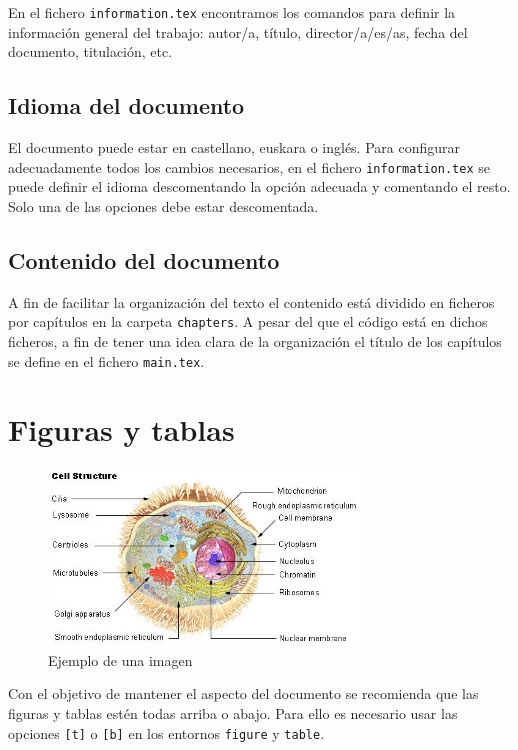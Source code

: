 En el fichero \texttt{information.tex} encontramos los comandos para definir la información general del trabajo: autor/a, título, director/a/es/as, fecha del documento, titulación, etc.

\subsection{Idioma del documento}

El documento puede estar en castellano, euskara o inglés. Para configurar adecuadamente todos los cambios necesarios, en el fichero \texttt{information.tex} se puede definir el idioma descomentando la opción adecuada y comentando el resto. Solo una de las opciones debe estar descomentada.




\subsection{Contenido del documento}

A fin de facilitar la organización del texto el contenido está dividido en ficheros por capítulos en la carpeta \texttt{chapters}. A pesar del que el código está en dichos ficheros, a fin de tener una idea clara de la organización el título de los capítulos se define en el fichero \texttt{main.tex}.

\section{Figuras y tablas}

\begin{figure}[t]
    \centering
	\includegraphics[width=0.75\textwidth]{figures/cell.jpg}
	\caption{Ejemplo de una imagen}\label{fig:ejemplo}
\end{figure}

Con el objetivo de mantener el aspecto del documento se recomienda que las figuras y tablas estén todas arriba o abajo. Para ello es necesario usar las opciones \texttt{[t]} o \texttt{[b]} en los entornos \texttt{figure} y \texttt{table}.

